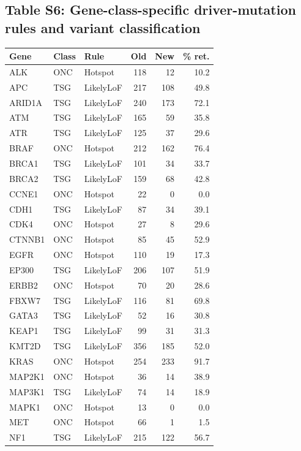 \documentclass[11pt,a4paper]{article}
\begin{document}
\subsection{Table S6: Gene-class-specific driver-mutation rules and variant classification}
\begin{table}[H]
\centering
\footnotesize
\begin{tabular}{lllrrr}
\toprule
\textbf{Gene} & \textbf{Class} & \textbf{Rule} & \textbf{Old} & \textbf{New} & \textbf{\% ret.} \\
\midrule
ALK & ONC & Hotspot & 118 & 12 & 10.2 \\
APC & TSG & LikelyLoF & 217 & 108 & 49.8 \\
ARID1A & TSG & LikelyLoF & 240 & 173 & 72.1 \\
ATM & TSG & LikelyLoF & 165 & 59 & 35.8 \\
ATR & TSG & LikelyLoF & 125 & 37 & 29.6 \\
BRAF & ONC & Hotspot & 212 & 162 & 76.4 \\
BRCA1 & TSG & LikelyLoF & 101 & 34 & 33.7 \\
BRCA2 & TSG & LikelyLoF & 159 & 68 & 42.8 \\
CCNE1 & ONC & Hotspot & 22 & 0 & 0.0 \\
CDH1 & TSG & LikelyLoF & 87 & 34 & 39.1 \\
CDK4 & ONC & Hotspot & 27 & 8 & 29.6 \\
CTNNB1 & ONC & Hotspot & 85 & 45 & 52.9 \\
EGFR & ONC & Hotspot & 110 & 19 & 17.3 \\
EP300 & TSG & LikelyLoF & 206 & 107 & 51.9 \\
ERBB2 & ONC & Hotspot & 70 & 20 & 28.6 \\
FBXW7 & TSG & LikelyLoF & 116 & 81 & 69.8 \\
GATA3 & TSG & LikelyLoF & 52 & 16 & 30.8 \\
KEAP1 & TSG & LikelyLoF & 99 & 31 & 31.3 \\
KMT2D & TSG & LikelyLoF & 356 & 185 & 52.0 \\
KRAS & ONC & Hotspot & 254 & 233 & 91.7 \\
MAP2K1 & ONC & Hotspot & 36 & 14 & 38.9 \\
MAP3K1 & TSG & LikelyLoF & 74 & 14 & 18.9 \\
MAPK1 & ONC & Hotspot & 13 & 0 & 0.0 \\
MET & ONC & Hotspot & 66 & 1 & 1.5 \\
NF1 & TSG & LikelyLoF & 215 & 122 & 56.7 \\

\end{tabular}
\end{table}
\end{document}
